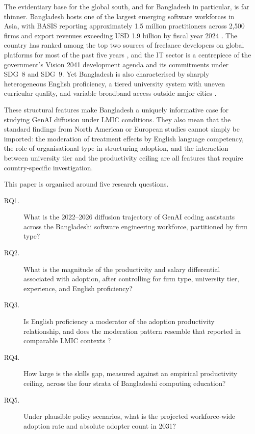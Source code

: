 \documentclass[11pt,a4paper]{article}
\begin{document}
The evidentiary base for the global south, and for Bangladesh in
particular, is far thinner. Bangladesh hosts one of the largest
emerging software workforces in Asia, with BASIS reporting
approximately 1.5 million practitioners across 2{,}500 firms and
export revenues exceeding USD 1.9 billion by fiscal year 2024
\citep{BASIS2024,BASIS2025}. The country has ranked among the top
two sources of freelance developers on global platforms for most of
the past five years \citep{KaramSiddiqueAlam2025}, and the IT sector
is a centrepiece of the government's Vision 2041 development agenda
and its commitments under SDG~8 and SDG~9. Yet Bangladesh is also
characterised by sharply heterogeneous English proficiency, a tiered
university system with uneven curricular quality, and variable
broadband access outside major cities
\citep{EFEPI2024,WorldBank2024DigitalBD,BBS2024LFS}.

These structural features make Bangladesh a uniquely informative
case for studying GenAI diffusion under LMIC conditions. They also
mean that the standard findings from North American or European
studies cannot simply be imported: the moderation of treatment
effects by English language competency, the role of organisational
type in structuring adoption, and the interaction between university
tier and the productivity ceiling are all features that require
country-specific investigation.

This paper is organised around five research questions.
\begin{sloppypar}
\begin{description}
  \item[\normalfont RQ1.] What is the 2022--2026 diffusion trajectory
        of GenAI coding assistants across the Bangladeshi software
        engineering workforce, partitioned by firm type?
  \item[\normalfont RQ2.] What is the magnitude of the productivity
        and salary differential associated with adoption, after
        controlling for firm type, university tier, experience, and
        English proficiency?
  \item[\normalfont RQ3.] Is English proficiency a moderator of the
        adoption productivity relationship, and does the moderation
        pattern resemble that reported in comparable LMIC contexts
        \citep{NurFarhanaTalukder2024}?
  \item[\normalfont RQ4.] How large is the skills gap, measured
        against an empirical productivity ceiling, across the four
        strata of Bangladeshi computing education?
  \item[\normalfont RQ5.] Under plausible policy scenarios, what is
        the projected workforce-wide adoption rate and absolute
        adopter count in 2031?
\end{description}
\end{sloppypar}
\end{document}
